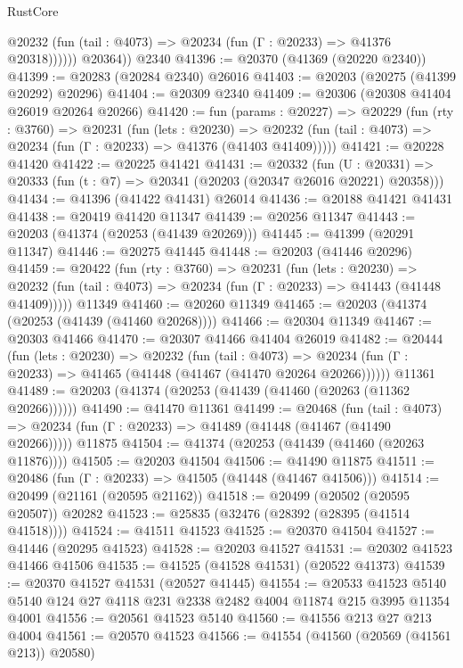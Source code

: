 \begin{lexlean}{RustCore}
\begin{coremodule}
              @20232 (fun (tail : @4073) => @20234 (fun (Γ : @20233) => @41376 @20318))))))
        @20364))
    @2340
@41396 := @20370 (@41369 (@20220 @2340))
@41399 := @20283 (@20284 @2340) @26016
@41403 := @20203 (@20275 (@41399 @20292) @20296)
@41404 := @20309 @2340
@41409 := @20306 (@20308 @41404 @26019 @20264 @20266)
@41420 := fun (params : @20227) =>
  @20229
    (fun (rty : @3760) =>
    @20231
      (fun (lets : @20230) =>
      @20232 (fun (tail : @4073) => @20234 (fun (Γ : @20233) => @41376 (@41403 @41409)))))
@41421 := @20228 @41420
@41422 := @20225 @41421
@41431 := @20332
    (fun (U : @20331) => @20333 (fun (t : @7) => @20341 (@20203 (@20347 @26016 @20221) @20358)))
@41434 := @41396 (@41422 @41431) @26014
@41436 := @20188 @41421 @41431
@41438 := @20419 @41420 @11347
@41439 := @20256 @11347
@41443 := @20203 (@41374 (@20253 (@41439 @20269)))
@41445 := @41399 (@20291 @11347)
@41446 := @20275 @41445
@41448 := @20203 (@41446 @20296)
@41459 := @20422
    (fun (rty : @3760) =>
    @20231
      (fun (lets : @20230) =>
      @20232 (fun (tail : @4073) => @20234 (fun (Γ : @20233) => @41443 (@41448 @41409)))))
    @11349
@41460 := @20260 @11349
@41465 := @20203 (@41374 (@20253 (@41439 (@41460 @20268))))
@41466 := @20304 @11349
@41467 := @20303 @41466
@41470 := @20307 @41466 @41404 @26019
@41482 := @20444
    (fun (lets : @20230) =>
    @20232
      (fun (tail : @4073) =>
      @20234 (fun (Γ : @20233) => @41465 (@41448 (@41467 (@41470 @20264 @20266))))))
    @11361
@41489 := @20203 (@41374 (@20253 (@41439 (@41460 (@20263 (@11362 @20266))))))
@41490 := @41470 @11361
@41499 := @20468
    (fun (tail : @4073) => @20234 (fun (Γ : @20233) => @41489 (@41448 (@41467 (@41490 @20266)))))
    @11875
@41504 := @41374 (@20253 (@41439 (@41460 (@20263 @11876))))
@41505 := @20203 @41504
@41506 := @41490 @11875
@41511 := @20486 (fun (Γ : @20233) => @41505 (@41448 (@41467 @41506)))
@41514 := @20499 (@21161 (@20595 @21162))
@41518 := @20499 (@20502 (@20595 @20507)) @20282
@41523 := @25835 (@32476 (@28392 (@28395 (@41514 @41518))))
@41524 := @41511 @41523
@41525 := @20370 @41504
@41527 := @41446 (@20295 @41523)
@41528 := @20203 @41527
@41531 := @20302 @41523 @41466 @41506
@41535 := @41525 (@41528 @41531) (@20522 @41373)
@41539 := @20370 @41527 @41531 (@20527 @41445)
@41554 := @20533
    @41523
    @5140
    @5140
    @124
    @27
    @4118
    @231
    @2338
    @2482
    @4004
    @11874
    @215
    @3995
    @11354
    @4001
@41556 := @20561 @41523 @5140
@41560 := @41556 @213 @27 @213 @4004
@41561 := @20570 @41523
@41566 := @41554 (@41560 (@20569 (@41561 @213)) @20580)

\end{coremodule}
\end{lexlean}
